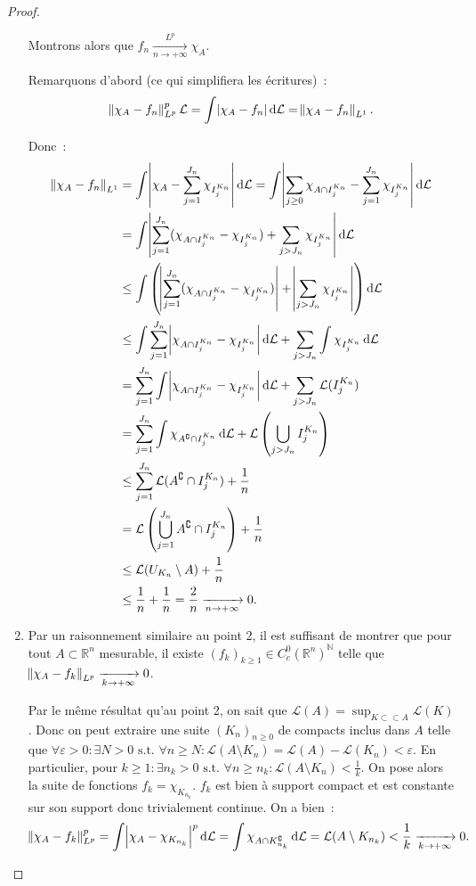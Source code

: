 \documentclass{article}
\newcommand{\pinfty}{{+\infty}}
\newcommand{\st}{\text{ s.t. }}
\newcommand{\C}{\complement}
\newcommand{\N}{{\mathbb N}}
\newcommand{\R}{{\mathbb R}}
\begin{document}
\begin{proof}
\begin{enumerate}
	Montrons alors que $f_n \xrightarrow[n \to \pinfty]{L^p} \chi_A$.

	Remarquons d'abord (ce qui simplifiera les écritures)~:
	\[\norm {\chi_A-f_n}^p_{L^p}\mathcal L = \int\abs {\chi_A - f_n}\dif\mathcal L = \norm {\chi_A-f_n}_{L^1}.\]

	Donc~:
	\begin{align*}
		\norm {\chi_A-f_n}_{L^1} &= \int\abs {\chi_A - \sum_{j=1}^{J_n}\chi_{I^{K_n}_j}}\dif\mathcal L
			= \int\abs {\sum_{j \geq 0}\chi_{A \cap I^{K_n}_j} - \sum_{j=1}^{J_n}\chi_{I^{K_n}_j}}\dif\mathcal L \\
		&= \int\abs {\sum_{j=1}^{J_n}(\chi_{A \cap I^{K_n}_j}-\chi_{I^{K_n}_j}) + \sum_{j > J_n}\chi_{I^{K_n}_j}}\dif\mathcal L \\
		&\leq \int\left(\abs {\sum_{j=1}^{J_n}(\chi_{A \cap I^{K_n}_j}-\chi_{I^{K_n}_j})} + \abs {\sum_{j > J_n}\chi_{I^{K_n}_j}}\right) \dif\mathcal L \\
		&\leq \int\sum_{j=1}^{J_n}\abs {\chi_{A \cap I^{K_n}_j}-\chi_{I^{K_n}_j}}\dif\mathcal L + \sum_{j > J_n}\int\chi_{I^{K_n}_j}\dif\mathcal L \\
		&= \sum_{j=1}^{J_n}\int\abs {\chi_{A \cap I^{K_n}_j}-\chi_{I^{K_n}_j}}\dif\mathcal L + \sum_{j > J_n}\mathcal L(I^{K_n}_j) \\
		&= \sum_{j=1}^{J_n}\int\chi_{A^\C \cap I^{K_n}_j}\dif\mathcal L + \mathcal L\left(\bigcup_{j > J_n}I^{K_n}_j\right) \\
		&\leq \sum_{j=1}^{J_n}\mathcal L(A^\C \cap I^{K_n}_j) + \frac 1n \\
		&= \mathcal L\left(\bigcup_{j=1}^{J_n}A^\C \cap I^{K_n}_j\right) + \frac 1n \\
		&\leq \mathcal L(U_{K_n} \setminus A) + \frac 1n \\
		&\leq \frac 1n + \frac 1n = \frac 2n \xrightarrow[n \to \pinfty]{} 0.
	\end{align*}

	\item Par un raisonnement similaire au point 2, il est suffisant de montrer que pour tout $A \subset \R^n$ mesurable, il existe $(f_k)_{k \geq 1} \in C^0_c(\R^n)^\N$ telle que
	$\norm {\chi_A-f_k}_{L^p} \xrightarrow[k \to \pinfty]{} 0$.

	Par le même résultat qu'au point 2, on sait que $\mathcal L(A) = \sup_{K \subset\subset A}\mathcal L(K)$. Donc on peut extraire une suite $(K_n)_{n \geq 0}$ de compacts
	inclus dans $A$ telle que $\forall \varepsilon > 0 : \exists N > 0 \st \forall n \geq N : \mathcal L(A \setminus K_n) = \mathcal L(A) - \mathcal L(K_n) < \varepsilon$.
	En particulier, pour $k \geq 1 : \exists n_k > 0 \st \forall n \geq n_k : \mathcal L(A \setminus K_n) < \frac 1k$. On pose alors la suite de fonctions $f_k = \chi_{K_{n_k}}$.
	$f_k$ est bien à support compact et est constante sur son support donc trivialement continue. On a bien~:
	\[\norm {\chi_A - f_k}_{L^p}^p = \int\abs {\chi_A-\chi_{K_{n_k}}}^p\dif\mathcal L = \int\chi_{A \cap K_{n_k}^\C}\dif\mathcal L = \mathcal L(A \setminus K_{n_k})
		< \frac 1k \xrightarrow[k \to \pinfty]{} 0.\]


\end{enumerate}
\end{proof}
\end{document}
